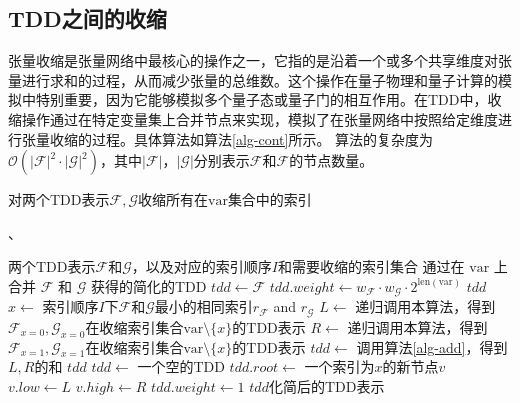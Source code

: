 \subsection*{TDD之间的收缩}
张量收缩是张量网络中最核心的操作之一，它指的是沿着一个或多个共享维度对张量进行求和的过程，从而减少张量的总维数。这个操作在量子物理和量子计算的模拟中特别重要，因为它能够模拟多个量子态或量子门的相互作用。在TDD中，收缩操作通过在特定变量集上合并节点来实现，模拟了在张量网络中按照给定维度进行张量收缩的过程。具体算法如算法\ref{alg-cont}所示。
算法的复杂度为\(\mathcal{O}(|\mathcal{F}|^2\cdot|\mathcal{G}|^2)\)，其中\(|\mathcal{F}|\)，\(|\mathcal{G}|\)分别表示\(\mathcal{F}\)和\(\mathcal{F}\)的节点数量。
\begin{algorithm}
\caption{对两个TDD表示\(\mathcal{F}, \mathcal{G}\)收缩所有在\(\text{var}\)集合中的索引}、
\label{alg-cont}
\begin{algorithmic}[1]
\Require 两个TDD表示\(\mathcal{F}\)和\(\mathcal{G}\)，以及对应的索引顺序\(I\)和需要收缩的索引集合
\Ensure 通过在 $\text{var}$ 上合并 \(\mathcal{F}\) 和 \(\mathcal{G}\) 获得的简化的TDD
    \State \(tdd \gets \mathcal{F}\)
    \State \(tdd.weight \gets w_{\mathcal{F}} \cdot w_{\mathcal{G}} \cdot 2^{\text{len}(\text{var})}\)
    \State \Return \(tdd\)
\EndIf
\State \(x \gets\) 索引顺序\(I\)下\(\mathcal{F}\)和\(\mathcal{G}\)最小的相同索引\(r_{\mathcal{F}}\) and \(r_{\mathcal{G}}\)
\State \(L \gets \) 递归调用本算法，得到\(\mathcal{F}_{x=0}, \mathcal{G}_{x=0}\)在收缩索引集合\(\text{var}\setminus\{x\}\)的TDD表示
\State \(R \gets \) 递归调用本算法，得到\(\mathcal{F}_{x=1}, \mathcal{G}_{x=1}\)在收缩索引集合\(\text{var}\setminus\{x\}\)的TDD表示
    \State \(tdd \gets\) 调用算法\ref{alg-add}，得到\(L, R\)的和
    \State \Return $tdd$
\Else
    \State \(tdd \gets\) 一个空的TDD
    \State \(tdd.root \gets\) 一个索引为\(x\)的新节点\(v\)
    \State \(v.low \gets L\)
    \State \(v.high \gets R\)
    \State \(tdd.weight \gets 1\)
    \State \Return \(tdd\)化简后的TDD表示
\EndIf
\end{algorithmic}
\end{algorithm}
